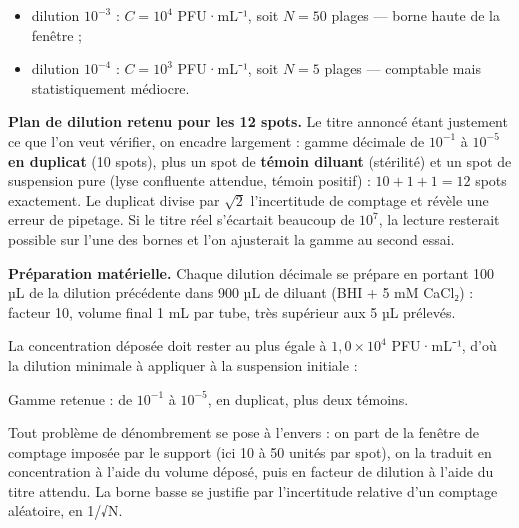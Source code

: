 \documentclass[11pt,a4paper]{article}
\providecommand{\tightlist}{\setlength{\itemsep}{0pt}\setlength{\parskip}{0pt}}
\newcommand{\equationajustee}[1]{%
  \sbox{\boiteequation}{$\displaystyle #1$}%
  \ifdim\wd\boiteequation>\linewidth
    \[\resizebox{\linewidth}{!}{\usebox{\boiteequation}}\]%
  \else
    \[#1\]%
  \fi}
\begin{document}
\equationajustee{\begin{aligned}
T\times10^{-n} &\le 10^{4} \\
n &\ge \log_{10} T - 4 \\
n &\ge 7 - 4 \\
n &\ge 3
\end{aligned}}

\begin{itemize}
\tightlist
\item
  dilution \(10^{-3}\) : \(C = 10^{4}\) PFU·mL⁻¹, soit \(N = 50\) plages --- borne haute de la fenêtre ;
\item
  dilution \(10^{-4}\) : \(C = 10^{3}\) PFU·mL⁻¹, soit \(N = 5\) plages --- comptable mais statistiquement médiocre.
\end{itemize}

\textbf{Plan de dilution retenu pour les 12 spots.} Le titre annoncé étant justement ce que l'on veut vérifier, on encadre largement : gamme décimale de \(10^{-1}\) à \(10^{-5}\) \textbf{en duplicat} (10 spots), plus un spot de \textbf{témoin diluant} (stérilité) et un spot de suspension pure (lyse confluente attendue, témoin positif) : \(10 + 1 + 1 = 12\) spots exactement. Le duplicat divise par \(\sqrt{2}\) l'incertitude de comptage et révèle une erreur de pipetage. Si le titre réel s'écartait beaucoup de \(10^{7}\), la lecture resterait possible sur l'une des bornes et l'on ajusterait la gamme au second essai.

\textbf{Préparation matérielle.} Chaque dilution décimale se prépare en portant 100 µL de la dilution précédente dans 900 µL de diluant (BHI + 5 mM CaCl₂) : facteur 10, volume final 1 mL par tube, très supérieur aux 5 µL prélevés.

La concentration déposée doit rester au plus égale à \(1{,}0\times10^{4}\) PFU·mL⁻¹, d'où la dilution minimale à appliquer à la suspension initiale :

\equationajustee{\boxed{\text{dilution} \ge 10^{-3}}}

Gamme retenue : de \(10^{-1}\) à \(10^{-5}\), en duplicat, plus deux témoins.

\begin{methode}

Tout problème de dénombrement se pose à l'envers : on part de la fenêtre de comptage imposée par le support (ici 10 à 50 unités par spot), on la traduit en concentration à l'aide du volume déposé, puis en facteur de dilution à l'aide du titre attendu. La borne basse se justifie par l'incertitude relative d'un comptage aléatoire, en 1/√N.

\end{methode}
\end{document}
